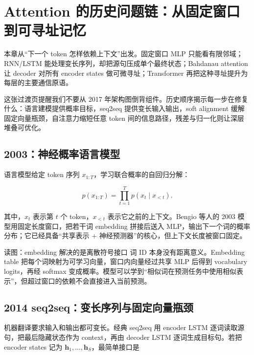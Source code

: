 \section{Attention 的历史问题链：从固定窗口到可寻址记忆}

本章从“下一个 token 怎样依赖上下文”出发。固定窗口 MLP 只能看有限邻域；RNN/LSTM 能处理变长序列，却把源句压成单个最终状态；Bahdanau attention 让 decoder 对所有 encoder states 做可微寻址；Transformer 再把这种寻址提升为每层的主要通信原语。


这张过渡页提醒我们不要从 2017 年架构图倒背组件。历史顺序揭示每一步在修复什么：语言建模提供概率目标，seq2seq 提供变长输入输出，soft alignment 缓解固定向量瓶颈，自注意力缩短任意 token 间的信息路径，残差与归一化则让深层堆叠可优化。

\subsection{2003：神经概率语言模型}

语言模型给定 token 序列 $x_{1:T}$，学习联合概率的自回归分解：

\[
p(x_{1:T})=\prod_{t=1}^{T}p(x_t\mid x_{<t}).
\]

其中，$x_t$ 表示第 $t$ 个 token，$x_{<t}$ 表示它之前的上下文。Bengio 等人的 2003 模型用固定长度窗口，把若干词 embedding 拼接后送入 MLP，输出下一个词的概率分布；它已经具备“共享表示 + 神经预测器”的核心，但上下文长度被窗口固定。


\begin{knowledgebox}{读图：embedding 解决的是离散符号接口}
词 ID 本身没有距离意义。Embedding table 把每个词映射为可学习向量，窗口内向量经过共享 MLP 后得到 vocabulary logits，再经 softmax 变成概率。模型可以学到“相似词在预测任务中使用相似表示”，但超过窗口的依赖不会直接进入当前预测。
\end{knowledgebox}

\subsection{2014 seq2seq：变长序列与固定向量瓶颈}

机器翻译要求输入和输出都可变长。经典 seq2seq 用 encoder LSTM 逐词读取源句，把最后隐藏状态作为 context，再由 decoder LSTM 逐词生成目标句。若把 encoder states 记为 $\mathbf h_1,\ldots,\mathbf h_S$，最简单接口是

